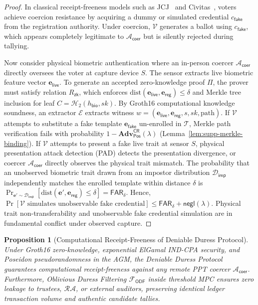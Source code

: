 \documentclass[10pt,letterpaper,journal]{IEEEtran}
\newtheorem{proposition}[theorem]{Proposition}
\begin{document}
\begin{proof}
In classical receipt-freeness models such as JCJ~\cite{Juels2005} and Civitas~\cite{Civitas2008}, voters achieve coercion resistance by acquiring a dummy or simulated credential $c_{\mathsf{fake}}$ from the registration authority. Under coercion, $\mathcal{V}$ generates a ballot using $c_{\mathsf{fake}}$, which appears completely legitimate to $\mathcal{A}_{\mathsf{coer}}$ but is silently rejected during tallying.

Now consider physical biometric authentication where an in-person coercer $\mathcal{A}_{\mathsf{coer}}$ directly oversees the voter at capture device $S$. The sensor extracts live biometric feature vector $\mathbf{e}_{\mathsf{live}}$. To generate an accepted zero-knowledge proof $\Pi$, the prover must satisfy relation $R_{\mathsf{zk}}$, which enforces $\mathrm{dist}(\mathbf{e}_{\mathsf{live}}, \mathbf{e}_{\mathsf{reg}}) \leq \delta$ and Merkle tree inclusion for leaf $C = \mathcal{H}_2(h_{\mathsf{bio}}, sk)$.
By Groth16 computational knowledge soundness, an extractor $\mathcal{E}$ extracts witness $w = (\mathbf{e}_{\mathsf{live}}, \mathbf{e}_{\mathsf{reg}}, s, sk, \mathrm{path})$.
If $\mathcal{V}$ attempts to substitute a fake template $\mathbf{e}_{\mathsf{fake}}$ un-enrolled in $\mathcal{T}$, Merkle path verification fails with probability $1 - \mathbf{Adv}_{\mathsf{Pos}}^{\mathsf{CR}}(\lambda)$ (Lemma~\ref{lem:supp-merkle-binding}).
If $\mathcal{V}$ attempts to present a fake live trait at sensor $S$, physical presentation attack detection (PAD) detects the presentation divergence, or coercer $\mathcal{A}_{\mathsf{coer}}$ directly observes the physical trait mismatch.
The probability that an unobserved biometric trait drawn from an impostor distribution $\mathcal{D}_{\mathsf{imp}}$ independently matches the enrolled template within distance $\delta$ is $\Pr_{\mathbf{e}' \sim \mathcal{D}_{\mathsf{imp}}}\left[\mathrm{dist}(\mathbf{e}', \mathbf{e}_{\mathsf{reg}}) \leq \delta\right] = \mathsf{FAR}_\delta$.
Hence, $\Pr[\mathcal{V}\text{ simulates unobservable fake credential}] \leq \mathsf{FAR}_\delta + \mathsf{negl}(\lambda)$. Physical trait non-transferability and unobservable fake credential simulation are in fundamental conflict under observed capture.
\end{proof}

\begin{proposition}[Computational Receipt-Freeness of Deniable Duress Protocol]
\label{prop:duress-receipt-freeness}
Under Groth16 zero-knowledge, exponential ElGamal IND-CPA security, and Poseidon pseudorandomness in the AGM, the Deniable Duress Protocol guarantees computational receipt-freeness against any remote PPT coercer $\mathcal{A}_{\mathsf{coer}}$. Furthermore, Oblivious Duress Filtering $\mathcal{F}_{\mathsf{ODF}}$ inside threshold MPC ensures zero leakage to trustees, $\mathcal{RA}$, or external auditors, preserving identical ledger transaction volume and authentic candidate tallies.
\end{proposition}
\end{document}
